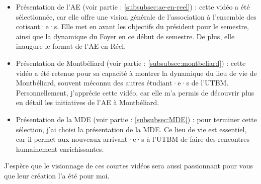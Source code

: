 \begin{itemize}
    \item Présentation de l'\gls{AE} (voir partie : \ref{subsubsec:ae-en-reel}) : cette vidéo a été sélectionnée, car elle offre une vision générale de l'association à l'ensemble des cotisant·e·s.
    Elle met en avant les objectifs du président pour le semestre, ainsi que la dynamique du Foyer en ce début de semestre.
    De plus, elle inaugure le format de l'\gls{AE} en Réel.
    \item Présentation de Montbéliard (voir partie : \ref{subsubsec:montbeliard}) : cette vidéo a été retenue pour sa capacité à montrer la dynamique du lieu de vie de Montbéliard, souvent méconnu des autres étudiant·e·s de l'\gls{UTBM}.
    Personnellement, j'apprécie cette vidéo, car elle m'a permis de découvrir plus en détail les initiatives de l'\gls{AE} à Montbéliard.
    \item Présentation de la MDE (voir partie : \ref{subsubsec:MDE}) : pour terminer cette sélection, j'ai choisi la présentation de la MDE. Ce lieu de vie est essentiel, car il permet aux nouveaux arrivant·e·s à l'\gls{UTBM} de faire des rencontres humainement enrichissantes.
\end{itemize}

J'espère que le visionnage de ces courtes vidéos sera aussi passionnant pour vous que leur création l'a été pour moi.